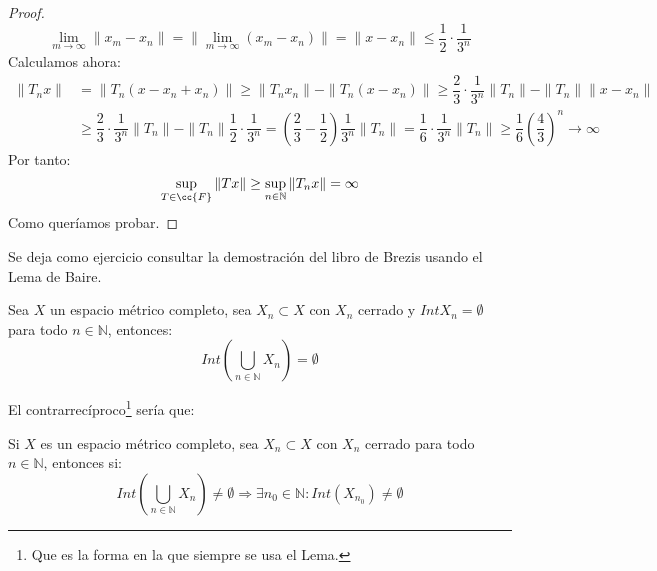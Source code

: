 \begin{teo}
\begin{proof}
        \begin{equation*}
            \lim_{m\to\infty}\|x_m-x_n\| = \|\lim_{m\to\infty}(x_m-x_n)\| = \|x-x_n\| \leq \dfrac{1}{2}\cdot \dfrac{1}{3^n}
        \end{equation*}
        Calculamos ahora:
        \begin{align*}
            \|T_nx\| &= \|T_n(x-x_n + x_n)\| \geq \|T_nx_n\| - \|T_n(x-x_n)\| \geq \dfrac{2}{3}\cdot \dfrac{1}{3^n}\|T_n\| - \|T_n\|\|x-x_n\| \\
                     &\geq \dfrac{2}{3}\cdot \dfrac{1}{3^n}\|T_n\| - \|T_n\|\dfrac{1}{2}\cdot \dfrac{1}{3^n} = \left(\dfrac{2}{3}-\dfrac{1}{2}\right) \dfrac{1}{3^n} \|T_n\| = \dfrac{1}{6}\cdot \dfrac{1}{3^n}\|T_n\| \geq \dfrac{1}{6}{\left(\dfrac{4}{3}\right)}^{n} \to \infty
        \end{align*}
        Por tanto:
        \begin{equation*}
            \sup_{T\in \cc{F}}\|Tx\| \geq \sup_{n\in \mathbb{N}}\|T_nx\| = \infty
        \end{equation*}
        Como queríamos probar.
    \end{proof}
\end{teo}

\begin{ejercicio}
    Se deja como ejercicio consultar la demostración del libro de Brezis usando el Lema de Baire.
\end{ejercicio}

\begin{lema}[de Baire]
    Sea $X$ un espacio métrico completo, sea $X_n\subset X$ con $X_n$ cerrado y $Int X_n = \emptyset $ para todo $n\in \mathbb{N}$, entonces:
    \begin{equation*}
        Int\left(\bigcup_{n\in \mathbb{N}} X_n\right) = \emptyset 
    \end{equation*}
\end{lema}

El contrarrecíproco\footnote{Que es la forma en la que siempre se usa el Lema.} sería que:
\begin{center}
    Si $X$ es un espacio métrico completo, sea $X_n\subset X$ con $X_n$ cerrado para todo $n\in \mathbb{N}$, entonces si:
    \begin{equation*}
        Int\left(\bigcup_{n\in \mathbb{N}}X_n\right) \neq \emptyset  \Longrightarrow \exists n_0\in \mathbb{N} : Int(X_{n_0}) \neq \emptyset 
    \end{equation*}
\end{center}


